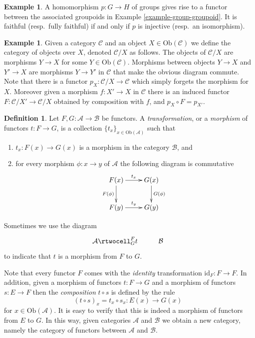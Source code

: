 \documentclass{amsart}
\theoremstyle{definition}
\newtheorem{definition}[theorem]{Definition}
\newtheorem{example}[theorem]{Example}
\theoremstyle{remark}
\numberwithin{equation}{subsection}
\begin{document}
\begin{example}
\label{example-group-homorphism-functor}
A homomorphism $p\colon G\to H$ of groups gives rise to a functor
between the associated groupoids in Example \ref{example-group-groupoid}. It is
faithful (resp.\ fully faithful) if and only if $p$ is injective (resp.\ an
isomorphism).
\end{example}

\begin{example}
\label{example-comma-category}
Given a category $\mathcal{C}$ and an object $X\in \text{Ob}(\mathcal{C})$
we define the category of objects over $X$, denoted $\mathcal{C}/X$ as follows.
The objects of $\mathcal{C}/X$ are morphisms $Y\to X$ for
some $Y\in \text{Ob}(\mathcal{C})$. Morphisms between objects
$Y\to X$ and $Y'\to X$ are morphisms $Y\to Y'$ in $\mathcal{C}$ that
make the obvious diagram commute.  Note that there is a functor
$p_X\colon \mathcal{C}/X\to \mathcal{C}$ which simply forgets the
morphism for $X$.  Moreover given a morphism $f\colon X'\to X$ in
$\mathcal{C}$ there is an induced functor 
$F\colon \mathcal{C}/X' \to \mathcal{C}/X$ obtained by composition with $f$,
and $p_X\circ F = p_{X'}$.
\end{example}

\begin{definition}
Let $F, G : \mathcal{A} \to \mathcal{B}$ be functors.
A {\it transformation}, or a {\it morphism} of functors
$t : F \to G$, is a collection $\{t_x\}_{x\in \text{Ob}(\mathcal{A})}$
such that
\begin{enumerate}
\item $t_x : F(x) \to G(x)$ is a morphism in the category $\mathcal{B}$, and
\item for every morphism $\phi : x \to y$ of $\mathcal{A}$ the following
diagram is commutative
$$
\xymatrix{
F(x) \ar[r]^{t_x} \ar[d]_{F(\phi)} & G(x) \ar[d]^{G(\phi)} \\
F(y) \ar[r]^{t_y} & G(y) }
$$
\end{enumerate}
\end{definition}

\noindent
Sometimes we use the diagram
$$\xymatrix{
\mathcal{A}
\rtwocell^F_{G}{t}
&
\mathcal{B}
}
$$
to indicate that $t$ is a morphism from $F$ to $G$.

\medskip\noindent
Note that every functor $F$ comes with the {\it identity} transformation
$\text{id}_F : F \to F$. In addition, given a morphism of
functors $t : F \to G$ and a morphism of functors $s : E \to F$
then the {\it composition} $t \circ s$ is defined by the rule
$$
(t \circ s)_x = t_x \circ s_x : E(x) \to G(x)
$$
for $x \in \text{Ob}(\mathcal{A})$.
It is easy to verify that this is indeed a morphism of functors
from $E$ to $G$.
In this way, given categories 
$\mathcal{A}$ and $\mathcal{B}$ we obtain a new category,
namely the category of functors between $\mathcal{A}$ and
$\mathcal{B}$.
\end{document}
